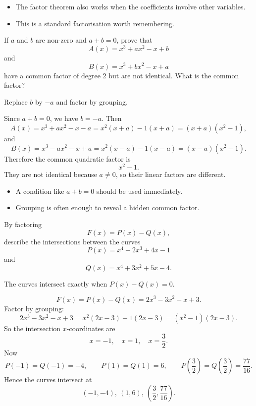 \begin{takeaways}
\begin{itemize}[leftmargin=*]
\item The factor theorem also works when the coefficients involve other variables.
\item This is a standard factorisation worth remembering.
\end{itemize}
\end{takeaways}

\begin{problem}
If $a$ and $b$ are non-zero and $a+b=0$, prove that
\[
A(x)=x^3+ax^2-x+b
\]
and
\[
B(x)=x^3+bx^2-x+a
\]
have a common factor of degree $2$ but are not identical. What is the common factor?
\end{problem}

\begin{hintbox}
Replace $b$ by $-a$ and factor by grouping.
\end{hintbox}

\begin{solution}
Since $a+b=0$, we have $b=-a$.
Then
\[
A(x)=x^3+ax^2-x-a=x^2(x+a)-1(x+a)=(x+a)(x^2-1),
\]
and
\[
B(x)=x^3-ax^2-x+a=x^2(x-a)-1(x-a)=(x-a)(x^2-1).
\]
Therefore the common quadratic factor is
\[
\boxed{x^2-1.}
\]
They are not identical because $a\ne0$, so their linear factors are different.
\end{solution}

\begin{takeaways}
\begin{itemize}[leftmargin=*]
\item A condition like $a+b=0$ should be used immediately.
\item Grouping is often enough to reveal a hidden common factor.
\end{itemize}
\end{takeaways}

\begin{problem}
By factoring
\[
F(x)=P(x)-Q(x),
\]
describe the intersections between the curves
\[
P(x)=x^4+2x^3+4x-1
\]
and
\[
Q(x)=x^4+3x^2+5x-4.
\]
\end{problem}

\begin{hintbox}
The curves intersect exactly when $P(x)-Q(x)=0$.
\end{hintbox}

\begin{solution}
\[
F(x)=P(x)-Q(x)=2x^3-3x^2-x+3.
\]
Factor by grouping:
\[
2x^3-3x^2-x+3=x^2(2x-3)-1(2x-3)=(x^2-1)(2x-3).
\]
So the intersection $x$-coordinates are
\[
x=-1,\quad x=1,\quad x=\frac32.
\]
Now
\[
P(-1)=Q(-1)=-4,\qquad P(1)=Q(1)=6,\qquad P\!\left(\frac32\right)=Q\!\left(\frac32\right)=\frac{77}{16}.
\]
Hence the curves intersect at
\[
\boxed{(-1,-4),\ \left(1,6\right),\ \left(\frac32,\frac{77}{16}\right).}
\]
\end{solution}

